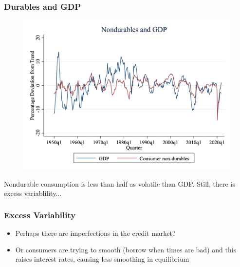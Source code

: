 \documentclass{beamer}
\begin{document}
\begin{frame}
\frametitle[alignment=center]{Durables and GDP}
\begin{figure}
\centering
\includegraphics[scale=0.2]{Figures/Fig_9pt7.png}
\end{figure}
Nondurable consumption is less than half as volatile than GDP.  Still, there is excess variablility...
\end{frame}

\begin{frame}
\frametitle[alignment=center]{Excess Variability}
\begin{itemize}
\item Perhaps there are imperfections in the credit market?
\bigskip
\item Or consumers are trying to smooth (borrow when times are bad) and this raises interest rates, causing less smoothing in equilibrium
\end{itemize}
\end{frame}
\end{document}
